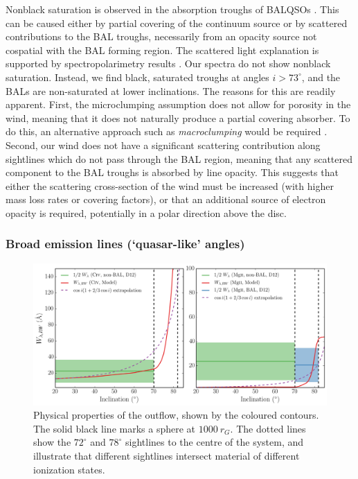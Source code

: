 \documentclass[useAMS,usenatbib]{mn2e_x}
\begin{document}
Nonblack saturation is observed in the absorption troughs of BALQSOs \citep{arav1999a,arav1999b}.
This can be caused either by partial covering of the continuum
source or by scattered contributions to the BAL troughs, necessarily
from an opacity source not cospatial with the BAL forming region.
The scattered light explanation is supported by spectropolarimetry results
\citep{lamy2000}. Our spectra do not show nonblack saturation.
Instead, we find black, saturated troughs at angles $i > 73^\circ$, and the BALs
are non-saturated at lower inclinations. The reasons for this are readily apparent. 
First, the microclumping assumption does not allow for 
porosity in the wind, meaning that it does not naturally produce
a partial covering absorber. To do this, an alternative approach
such as {\em macroclumping} would be required \citep[e.g.][]{surlan2012,hamann2008}.
Second, our wind does not have a significant scattering 
contribution along sightlines which do not pass through the BAL region,
meaning that any scattered component to the BAL troughs is absorbed by line opacity.
This suggests that either the scattering cross-section of the wind must
be increased (with higher mass loss rates or covering factors), or 
that an additional source of electron opacity is required, potentially
in a polar direction above the disc.


\subsubsection{Broad emission lines (`quasar-like' angles)}

\begin{figure} %
\centering
\includegraphics[width=1.0\textwidth]{figures/ew.png}
\caption
{
Physical properties of the outflow, shown by the coloured contours.
The solid black line marks a sphere at $1000~r_G$.
The dotted lines show the $72^\circ$ and $78^\circ$ sightlines 
to the centre of the system, and illustrate that different sightlines
intersect material of different ionization states.
}
\label{fig:ew}
\end{figure} %
\end{document}
